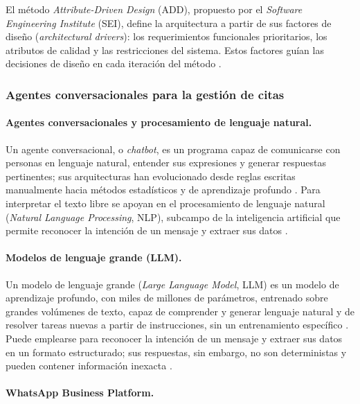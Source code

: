 El método \textit{Attribute-Driven Design} (ADD), propuesto por el
\textit{Software Engineering Institute} (SEI), define la arquitectura a partir de
sus factores de diseño (\textit{architectural drivers}): los requerimientos
funcionales prioritarios, los atributos de calidad y las restricciones del sistema.
Estos factores guían las decisiones de diseño en cada iteración del método
\cite{cervantes2016designing}.

\subsubsection{Agentes conversacionales para la gestión de citas}

\paragraph{Agentes conversacionales y procesamiento de lenguaje natural.}

Un agente conversacional, o \textit{chatbot}, es un programa capaz de comunicarse con
personas en lenguaje natural, entender sus expresiones y generar respuestas
pertinentes; sus arquitecturas han evolucionado desde reglas escritas manualmente
hacia métodos estadísticos y de aprendizaje profundo \cite{csaky2019chatbot}. Para
interpretar el texto libre se apoyan en el procesamiento de lenguaje natural
(\textit{Natural Language Processing}, NLP), subcampo de la inteligencia artificial
que permite reconocer la intención de un mensaje y extraer sus datos
\cite{ibm2024nlp}.

\paragraph{Modelos de lenguaje grande (LLM).}

Un modelo de lenguaje grande (\textit{Large Language Model}, LLM) es un modelo de
aprendizaje profundo, con miles de millones de parámetros, entrenado sobre grandes
volúmenes de texto, capaz de comprender y generar lenguaje natural y de resolver
tareas nuevas a partir de instrucciones, sin un entrenamiento específico
\cite{zhao2023llmsurvey}. Puede emplearse para reconocer la intención de un mensaje
y extraer sus datos en un formato estructurado; sus respuestas, sin embargo, no son
deterministas y pueden contener información inexacta \cite{zhao2023llmsurvey}.

\paragraph{WhatsApp Business Platform.}

